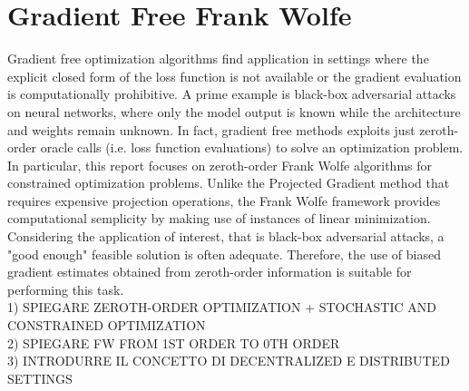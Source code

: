 \section{Gradient Free Frank Wolfe}
Gradient free optimization algorithms find application in settings where the explicit closed form of the loss function is not available or the gradient evaluation is computationally prohibitive. A prime example is black-box adversarial attacks on neural networks, where only the model output is known while the architecture and weights remain unknown. In fact, gradient free methods exploits just zeroth-order oracle calls (i.e. loss function evaluations) to solve an optimization problem.\\
In particular, this report focuses on zeroth-order Frank Wolfe algorithms for constrained optimization problems. Unlike the Projected Gradient method that requires expensive projection operations, the Frank Wolfe framework provides computational semplicity by making use of instances of linear minimization. \\
Considering the application of interest, that is black-box adversarial attacks, a "good enough" feasible solution is often adequate. Therefore, the use of biased gradient estimates obtained from zeroth-order information is suitable for performing this task.\\

1) SPIEGARE ZEROTH-ORDER OPTIMIZATION + STOCHASTIC AND CONSTRAINED OPTIMIZATION\\
2) SPIEGARE FW FROM 1ST ORDER TO 0TH ORDER\\
3) INTRODURRE IL CONCETTO DI DECENTRALIZED E DISTRIBUTED SETTINGS\\

